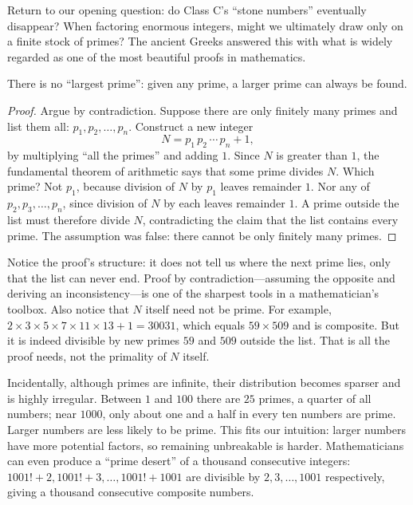 Return to our opening question: do Class C's ``stone numbers'' eventually disappear? When factoring enormous integers, might we ultimately draw only on a finite stock of primes? The ancient Greeks answered this with what is widely regarded as one of the most beautiful proofs in mathematics.

\begin{dingli}
There is no ``largest prime'': given any prime, a larger prime can always be found.
\end{dingli}

\begin{proof}
Argue by contradiction. Suppose there are only finitely many primes and list them all: $p_1,p_2,\dots,p_n$. Construct a new integer
\[
N=p_1\,p_2\,\cdots\,p_n+1,
\]
by multiplying ``all the primes'' and adding $1$. Since $N$ is greater than $1$, the fundamental theorem of arithmetic says that some prime divides $N$. Which prime? Not $p_1$, because division of $N$ by $p_1$ leaves remainder $1$. Nor any of $p_2,p_3,\dots,p_n$, since division of $N$ by each leaves remainder $1$. A prime outside the list must therefore divide $N$, contradicting the claim that the list contains every prime. The assumption was false: there cannot be only finitely many primes.
\end{proof}

Notice the proof's structure: it does not tell us where the next prime lies, only that the list can never end. Proof by contradiction---assuming the opposite and deriving an inconsistency---is one of the sharpest tools in a mathematician's toolbox. Also notice that $N$ itself need not be prime. For example, $2\times3\times5\times7\times11\times13+1=30031$, which equals $59\times509$ and is composite. But it is indeed divisible by new primes $59$ and $509$ outside the list. That is all the proof needs, not the primality of $N$ itself.

Incidentally, although primes are infinite, their distribution becomes sparser and is highly irregular. Between $1$ and $100$ there are $25$ primes, a quarter of all numbers; near $1000$, only about one and a half in every ten numbers are prime. Larger numbers are less likely to be prime. This fits our intuition: larger numbers have more potential factors, so remaining unbreakable is harder. Mathematicians can even produce a ``prime desert'' of a thousand consecutive integers: $1001!+2,1001!+3,\dots,1001!+1001$ are divisible by $2,3,\dots,1001$ respectively, giving a thousand consecutive composite numbers.

